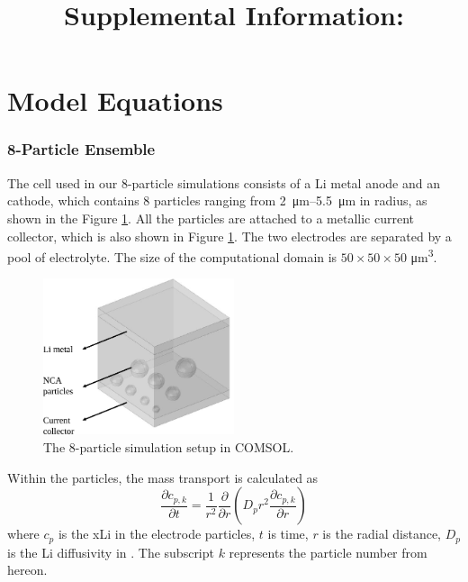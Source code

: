 \documentclass{article}
\title{Supplemental Information: \mytitle}
\begin{document}
\maketitle


\section{Model Equations}

\subsubsection{8-Particle Ensemble}

The cell used in our 8-particle simulations consists of a Li metal
anode and an \nca{} cathode, which contains 8 particles ranging from
\SIrange{2}{5.5}{\micro\meter} in radius, as shown in the Figure
\ref{fig:8-particle-box}. All the particles are attached to a metallic
current collector, which is also shown in Figure
\ref{fig:8-particle-box}. The two electrodes are separated by a pool
of electrolyte. The size of the computational domain is $50\times
50\times 50$ \si{\micro\meter\cubed}.

\begin{figure}
  \centering
  \includegraphics[width=0.5\textwidth]{8-particle-simulation.pdf}
  \caption{The 8-particle simulation setup in COMSOL.}
  \label{fig:8-particle-box}
\end{figure}

Within the \nca{} particles, the mass transport is calculated
as\cite{newman1993,newman1994}
\begin{equation}
  \frac{\partial c_{p,k}}{\partial t}=\frac 1{r^2}\frac \partial {\partial r}\left(D_pr^2\frac{\partial c_{p,k}}{\partial r}\right)
  \label{eq:1a}
\end{equation}
where $c_p$ is the \gls{xLi} in the electrode particles, $t$ is time,
$r$ is the radial distance, $D_p$ is the Li diffusivity in \nca{}. The
subscript $k$ represents the particle number from hereon.
\end{document}
